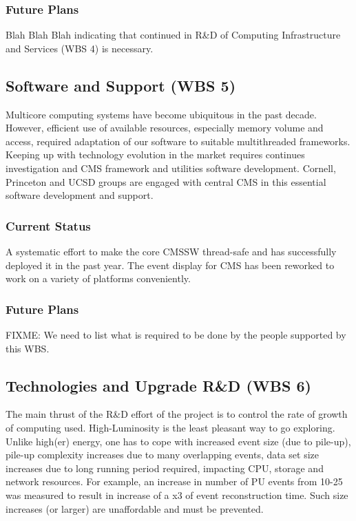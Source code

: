 \documentclass[11pt,a4paper]{article}
\begin{document}
\subsubsection{Future Plans}

Blah Blah Blah indicating that continued in R\&D of {Computing Infrastructure and Services (WBS 4)}
is necessary.

\subsection{Software and Support (WBS 5)}

Multicore computing systems have become ubiquitous in the past
decade. However, efficient use of available resources, especially
memory volume and access, required adaptation of our software to
suitable multithreaded frameworks. Keeping up with technology
evolution in the market requires continues investigation and CMS
framework and utilities software development.  Cornell, Princeton and
UCSD groups are engaged with central CMS in this essential software
development and support.

\subsubsection{Current Status}

A systematic effort to make the core CMSSW thread-safe and has
successfully deployed it in the past year.  The event display
for CMS has been reworked to work on a variety of platforms
conveniently.

\subsubsection{Future Plans}

{FIXME: We need to list what is required to be done by the people
  supported by this WBS.}

\subsection{Technologies and Upgrade R\&D (WBS 6)}

The main thrust of the R\&D effort of the project is to control the
rate of growth of computing used.  High-Luminosity is the least
pleasant way to go exploring. Unlike high(er) energy, one has to cope
with increased event size (due to pile-up), pile-up complexity
increases due to many overlapping events, data set size increases due
to long running period required, impacting CPU, storage and network
resources.  For example, an increase in number of PU events from 10-25
was measured to result in increase of a x3 of event reconstruction
time. Such size increases (or larger) are unaffordable and must be
prevented.
\end{document}
